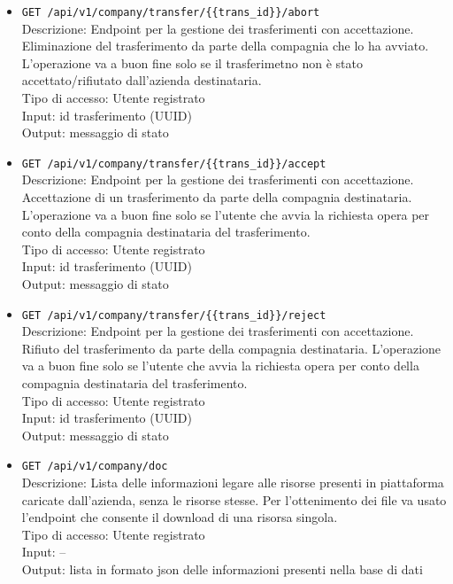 \documentclass[a4paper,11pt]{article}
\begin{document}
\begin{itemize}
  \item \texttt{GET /api/v1/company/transfer/\{\{trans\_id\}\}/abort}
        \\ Descrizione: Endpoint per la gestione dei trasferimenti con accettazione. Eliminazione del trasferimento da parte della compagnia che lo ha avviato. L'operazione va a buon fine solo se il trasferimetno non è stato accettato/rifiutato dall'azienda destinataria.
        \\ Tipo di accesso: Utente registrato
        \\ Input: id trasferimento (UUID)
        \\ Output: messaggio di stato

  \item \texttt{GET /api/v1/company/transfer/\{\{trans\_id\}\}/accept}
        \\ Descrizione: Endpoint per la gestione dei trasferimenti con accettazione. Accettazione di un trasferimento da parte della compagnia destinataria. L'operazione va a buon fine solo se l'utente che avvia la richiesta opera per conto della compagnia destinataria del trasferimento.
        \\ Tipo di accesso: Utente registrato
        \\ Input: id trasferimento (UUID)
        \\ Output: messaggio di stato

  \item \texttt{GET /api/v1/company/transfer/\{\{trans\_id\}\}/reject}
        \\ Descrizione: Endpoint per la gestione dei trasferimenti con accettazione. Rifiuto del trasferimento da parte della compagnia destinataria. L'operazione va a buon fine solo se l'utente che avvia la richiesta opera per conto della compagnia destinataria del trasferimento.
        \\ Tipo di accesso: Utente registrato
        \\ Input: id trasferimento (UUID)
        \\ Output: messaggio di stato

  \item \texttt{GET /api/v1/company/doc}
        \\ Descrizione: Lista delle informazioni legare alle risorse presenti in piattaforma caricate dall'azienda, senza le risorse stesse. Per l'ottenimento dei file va usato l'endpoint che consente il download di una risorsa singola.
        \\ Tipo di accesso: Utente registrato
        \\ Input: --
        \\ Output: lista in formato json delle informazioni presenti nella base di dati


\end{itemize}
\end{document}
